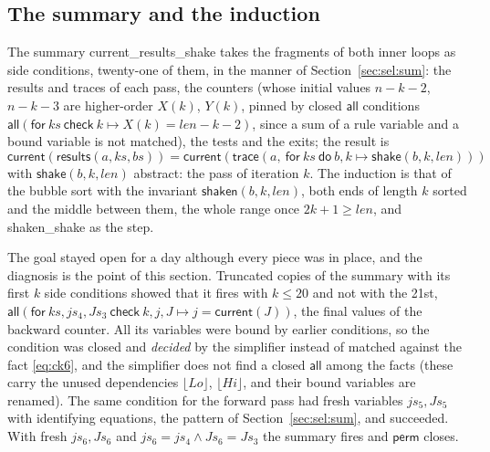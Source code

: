 \documentclass[11pt,a4paper]{article}
\newcommand{\bl}[1]{\lfloor #1\rfloor}                       %
\newcommand{\tr}[3]{\mathsf{trace}(#1,\ \mathsf{for}\ #2\ \mathsf{do}\ #3)}
\newcommand{\al}[2]{\mathsf{all}(\mathsf{for}\ #1\ \mathsf{check}\ #2)}
\newcommand{\cur}{\mathsf{current}}
\newcommand{\perm}{\mathsf{perm}}
\newcommand{\lemma}[1]{\textsf{#1}}
\begin{document}
\subsection{The summary and the induction}
The summary \lemma{current\_results\_shake} takes the fragments of both inner loops as side conditions,
twenty-one of them, in the manner of Section~\ref{sec:sel:sum}: the results and traces of each pass, the
counters (whose initial values $n - k - 2$, $n - k - 3$ are higher-order $X(k)$, $Y(k)$, pinned by closed
$\mathsf{all}$ conditions $\al{ks}{k \mapsto X(k) = len - k - 2}$, since a sum of a rule variable and a bound
variable is not matched), the tests and the exits; the result is
\[ \cur(\mathsf{results}(a, ks, bs)) = \cur(\tr{a}{ks}{b, k \mapsto \mathsf{shake}(b, k, len)}) \]
with $\mathsf{shake}(b, k, len)$ abstract: the pass of iteration $k$. The induction is that of the bubble sort
with the invariant $\mathsf{shaken}(b, k, len)$, both ends of length $k$ sorted and the middle between them,
the whole range once $2k + 1 \ge len$, and \lemma{shaken\_shake} as the step.

The goal stayed open for a day although every piece was in place, and the diagnosis is the point of this
section. Truncated copies of the summary with its first $k$ side conditions showed that it fires with
$k \le 20$ and not with the 21st, $\al{ks, js_4, Js_3}{k, j, J \mapsto j = \cur(J)}$, the final values of
the backward counter. All its variables were bound by earlier conditions, so the condition was closed and
\emph{decided} by the simplifier instead of matched against the fact \eqref{eq:ck6}, and the simplifier
does not find a closed $\mathsf{all}$ among the facts (these carry the unused dependencies $\bl{Lo}$, $\bl{Hi}$,
and their bound variables are renamed). The same condition for the forward pass had fresh variables
$js_5, Js_5$ with identifying equations, the pattern of Section~\ref{sec:sel:sum}, and succeeded. With
fresh $js_6, Js_6$ and $js_6 = js_4 \wedge Js_6 = Js_3$ the summary fires and $\perm$ closes.
\end{document}
